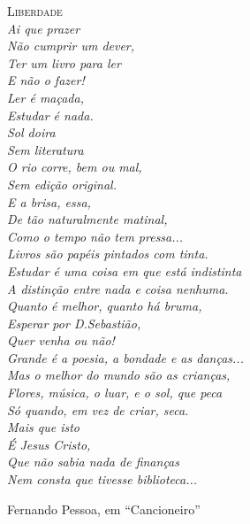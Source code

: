 \begin{fullwidth}
{\noindent\LARGE\textsc{Liberdade}} \\

{\it
\noindent{}Ai que prazer \\
Não cumprir um dever, \\
Ter um livro para ler \\
E não o fazer! \\
Ler é maçada, \\
Estudar é nada. \\
Sol doira \\
Sem literatura \\
O rio corre, bem ou mal, \\
Sem edição original. \\
E a brisa, essa, \\
De tão naturalmente matinal, \\
Como o tempo não tem pressa... \\

\noindent{}Livros são papéis pintados com tinta. \\
Estudar é uma coisa em que está indistinta \\
A distinção entre nada e coisa nenhuma. \\

\noindent{}Quanto é melhor, quanto há bruma, \\
Esperar por D.Sebastião, \\
Quer venha ou não! \\

\noindent{}Grande é a poesia, a bondade e as danças... \\
Mas o melhor do mundo são as crianças, \\

\noindent{}Flores, música, o luar, e o sol, que peca \\
Só quando, em vez de criar, seca. \\

\noindent{}Mais que isto \\
É Jesus Cristo, \\
Que não sabia nada de finanças \\
Nem consta que tivesse biblioteca... \\
}

\noindent{}Fernando Pessoa, em ``Cancioneiro''

\end{fullwidth}

\thispagestyle{empty}
\clearpage
